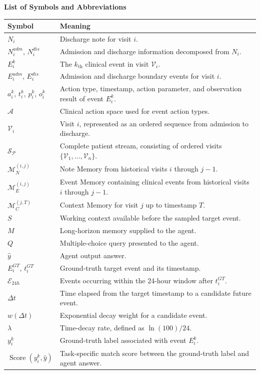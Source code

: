 \centerline{\xiaoyi\bf List of Symbols and Abbreviations}

\vspace{1em}

{\fontsize{10}{12}\selectfont
\setlength{\tabcolsep}{4pt}
\renewcommand{\arraystretch}{1.18}
\begin{tabular*}{\textwidth}{p{}@{\extracolsep{\fill}}p{}}
    \toprule
    \textbf{Symbol} & \textbf{Meaning} \\
    \midrule
    $N_i$ & Discharge note for visit $i$. \\
    $N_i^{adm}$, $N_i^{dis}$ & Admission and discharge information decomposed from $N_i$. \\
    $E_i^k$ & The $k_\text{th}$ clinical event in visit $\mathcal{V}_i$. \\
    $E_i^{adm}$, $E_i^{dis}$ & Admission and discharge boundary events for visit $i$. \\
    $a_i^k$, $t_i^k$, $p_i^k$, $o_i^k$ & Action type, timestamp, action parameter, and observation result of event $E_i^k$. \\
    $\mathcal{A}$ & Clinical action space used for event action types. \\
    $\mathcal{V}_i$ & Visit $i$, represented as an ordered sequence from admission to discharge. \\
    $\mathcal{S_P}$ & Complete patient stream, consisting of ordered visits $\{\mathcal{V}_1,\dots,\mathcal{V}_n\}$. \\
    $\mathcal{M}^{(i,j)}_N$ & Note Memory from historical visits $i$ through $j-1$. \\
    $\mathcal{M}^{(i,j)}_E$ & Event Memory containing clinical events from historical visits $i$ through $j-1$. \\
    $\mathcal{M}_C^{(j,T)}$ & Context Memory for visit $j$ up to timestamp $T$. \\
    $S$ & Working context available before the sampled target event. \\
    $M$ & Long-horizon memory supplied to the agent. \\
    $Q$ & Multiple-choice query presented to the agent. \\
    $\hat{y}$ & Agent output answer. \\
    $E_i^{GT}$, $t_i^{GT}$ & Ground-truth target event and its timestamp. \\
    $\mathcal{E}_{24h}$ & Events occurring within the 24-hour window after $t_i^{GT}$. \\
    $\Delta t$ & Time elapsed from the target timestamp to a candidate future event. \\
    $w(\Delta t)$ & Exponential decay weight for a candidate event. \\
    $\lambda$ & Time-decay rate, defined as $\ln(100)/24$. \\
    $y_i^k$ & Ground-truth label associated with event $E_i^k$. \\
    $\operatorname{Score}(y_i^k,\hat{y})$ & Task-specific match score between the ground-truth label and agent answer. \\
    \bottomrule
\end{tabular*}}

